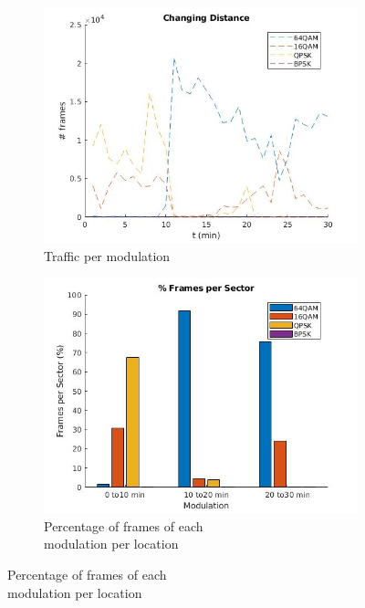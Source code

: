 \documentclass[12]{article}
\begin{document}
\begin{figure}[!htb]
\hspace*{-3cm}
\begin{subfigure}{.5\textwidth}
  \centering
  \includegraphics[width=\linewidth]{"measurement 1/g_fig1"}
  \caption{Traffic per modulation}
  \label{fig:g_meas1_sub1}
\end{subfigure}%
\hspace*{-0.6cm}
\begin{subfigure}{.5\textwidth}
  \includegraphics[width=\linewidth]{"measurement 1/g_fig2"}
  \caption{Percentage of frames of each\\ modulation per location}
  \label{fig:g_meas1_sub2}
\end{subfigure}%

\end{figure}
\end{document}
